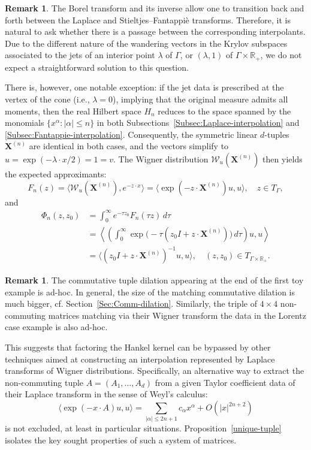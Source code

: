 \documentclass[11pt,reqno]{amsart}
\theoremstyle{plain}
\theoremstyle{definition}
\newtheorem{remark}[theorem]{Remark}
\numberwithin{equation}{section}
\begin{document}
\begin{remark}
The Borel transform and its inverse allow one to transition back and forth between the Laplace and Stieltjes–Fantappi\`e transforms. Therefore, it is natural to ask whether there is a passage between the corresponding interpolants. Due to the different nature of the wandering vectors in the Krylov subspaces associated to the jets of an interior point $\lambda$ of $\Gamma$, or $(\lambda, 1)$ of $\Gamma \times \mathbb{R}_+$, we do not expect a straightforward solution to this question.

There is, however, one notable exception: if the jet data is prescribed at the vertex of the cone (i.e., $\lambda = 0$), implying that the original measure admits all moments, then the real Hilbert space $H_n$ reduces to the space spanned by the monomials $\{x^\alpha : |\alpha| \leq n \}$ in both Subsections~\ref{Subsec:Laplace-interpolation} and \ref{Subsec:Fantappie-interpolation}.
Consequently, the symmetric linear $d$-tuples $\mathbf{X}^{(n)}$ are identical in both cases, and the vectors simplify to $u = \exp(-\lambda \cdot x / 2) = 1 = v$. The Wigner distribution $\mathcal{W}_u(\mathbf{X}^{(n)})$ then yields the expected approximants:
$$
F_n(z) = \langle \mathcal{W}_u(\mathbf{X}^{(n)}), e^{-z\cdot x} \rangle = \langle \exp(-z\cdot \mathbf{X}^{(n)}) u, u \rangle, \quad z \in T_\Gamma,
$$
and 
\begin{align*}
    \Phi_n(z, z_0) &= \int_{0}^\infty e^{-\tau z_0} F_n(\tau z) \, d\tau \\
    &= \left\langle \left( \int_{0}^\infty \exp\bigl(-\tau (z_0 I + z\cdot \mathbf{X}^{(n)})\bigr) \, d\tau \right) u , u \right\rangle \\
    &= \langle (z_0 I + z\cdot \mathbf{X}^{(n)})^{-1} u, u \rangle, \quad (z, z_0) \in T_{\Gamma \times \mathbb{R}_+}.
\end{align*}


   
\end{remark}
 
\begin{remark} The commutative tuple dilation appearing at the end of the first toy example is ad-hoc. In general, the size of the matching commutative dilation is much bigger, cf. Section~\ref{Sec:Comm-dilation}. Similarly, the triple of $4 \times 4$ non-commuting matrices matching via their Wigner transform the data in the Lorentz case example is also ad-hoc.

This suggests that factoring the Hankel kernel can be bypassed by other techniques aimed at constructing an interpolation represented by Laplace transforms of Wigner distributions. Specifically, an alternative way to extract the non-commuting tuple $A=(A_1, \dots, A_d)$ from a given Taylor coefficient data of their Laplace transform in the sense of Weyl's calculus:
$$ \langle \exp ( - x\cdot A) u, u\rangle = \sum_{|\alpha| \leq 2n+1} c_\alpha x^\alpha + O(|x|^{2n+2})$$
is not excluded, at least in particular situations. Proposition~\ref{unique-tuple} isolates the key sought properties of such a system of matrices.
\end{remark} 
\end{document}
